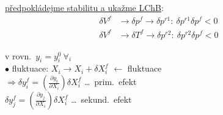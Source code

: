 \begingroup\color{NavyBlue}
\begin{minipage}{0.55\textwidth}
\underline{předpokládejme stabilitu a ukažme LChB}:
\begin{align*}
  \delta V^f &\to \delta p^f \to \delta p^{r1}:\ \delta p^{r1}\delta p^f < 0 \\
  \delta V^f &\to \delta T^f \to \delta p^{r2}:\ \delta p^{r2}\delta p^f < 0
\end{align*}
\end{minipage}
\begin{minipage}{0.43\textwidth}
{\scriptsize v rovn.\ $y_i = y_i^0\ \forall_i$ \\
$\bullet$ fluktuace: $X_i\to X_i + \delta X_i^f$ $\leftarrow$ fluktuace \\
$\Rightarrow \delta y_i^f = \left(\frac{\partial y_i}{\partial X_i}\right)\delta X_i^f$ \dots\ prim.\ efekt \\
\phantom{$\Rightarrow$} $\delta y_j^f = \left(\frac{\partial y_j}{\partial X_i}\right)\delta X_i^f$ \dots\ sekund.\ efekt}
\end{minipage}

